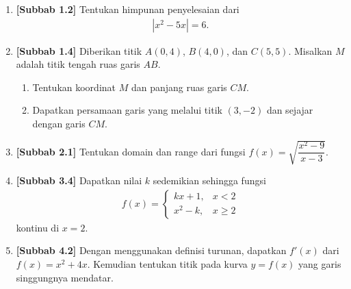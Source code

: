 \documentclass[10pt,openany,a4paper]{article}
\theoremstyle{definition}
\theoremstyle{definition}
\theoremstyle{plain}
\begin{document}
\begin{enumerate}
    \item \textbf{[Subbab 1.2]} Tentukan himpunan penyelesaian dari
    \begin{align*}
        \left|x^2-5x\right|=6.
    \end{align*}

    \item \textbf{[Subbab 1.4]} Diberikan titik $A(0,4)$, $B(4,0)$, dan $C(5,5)$. Misalkan $M$ adalah titik tengah ruas garis $AB$.
    \begin{enumerate}
        \item Tentukan koordinat $M$ dan panjang ruas garis $CM$.
        \item Dapatkan persamaan garis yang melalui titik $(3,-2)$ dan sejajar dengan garis $CM$.
    \end{enumerate}

    \item \textbf{[Subbab 2.1]} Tentukan domain dan range dari fungsi $f(x)=\sqrt{\dfrac{x^2-9}{x-3}}$.

    \item \textbf{[Subbab 3.4]} Dapatkan nilai $k$ sedemikian sehingga fungsi
    \begin{align*}
        f(x)=\begin{cases}
            kx+1, & x<2\\
            x^2-k, & x\geq 2
        \end{cases}
    \end{align*}
    kontinu di $x=2$.

    \item \textbf{[Subbab 4.2]} Dengan menggunakan definisi turunan, dapatkan $f'(x)$ dari $f(x)=x^2+4x$. Kemudian tentukan titik pada kurva $y=f(x)$ yang garis singgungnya mendatar.
\end{enumerate}

\newpage
\end{document}
